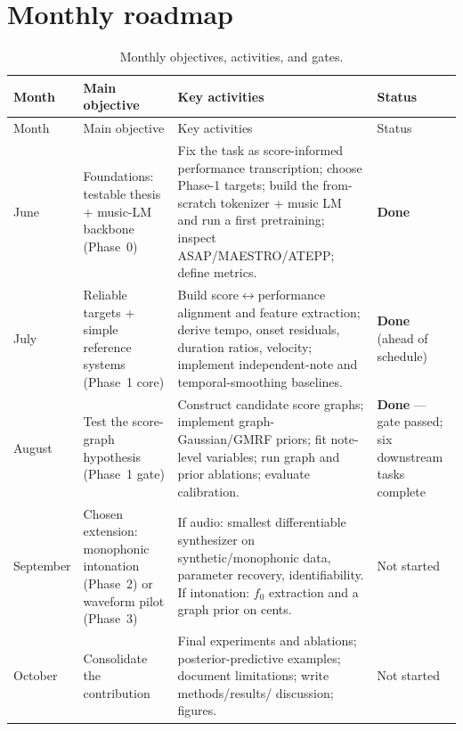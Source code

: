 \documentclass[11pt,a4paper]{report}
\begin{document}
\section{Monthly roadmap}
\begin{longtable}{@{}p{1.3cm}p{3.5cm}p{4.6cm}p{3.4cm}@{}}
\caption{Monthly objectives, activities, and gates.}\label{tab:monthly}\\
\toprule
Month & Main objective & Key activities & Status \\
\midrule
\endfirsthead
\toprule
Month & Main objective & Key activities & Status \\
\midrule
\endhead
\bottomrule
\endfoot
June & Foundations: testable thesis + music-LM backbone (Phase~0) &
Fix the task as score-informed performance transcription; choose Phase-1 targets;
build the from-scratch tokenizer + music LM and run a first pretraining; inspect
ASAP/MAESTRO/ATEPP; define metrics. & \textbf{Done} \\
July & Reliable targets + simple reference systems (Phase~1 core) &
Build score$\leftrightarrow$performance alignment and feature extraction; derive
tempo, onset residuals, duration ratios, velocity; implement independent-note and
temporal-smoothing baselines. & \textbf{Done} (ahead of schedule) \\
August & Test the score-graph hypothesis (Phase~1 gate) &
Construct candidate score graphs; implement graph-Gaussian/GMRF priors; fit
note-level variables; run graph and prior ablations; evaluate calibration. &
\textbf{Done} --- gate passed; six downstream tasks complete \\
September & Chosen extension: monophonic intonation (Phase~2) or waveform pilot
(Phase~3) & If audio: smallest differentiable synthesizer on synthetic/monophonic
data, parameter recovery, identifiability. If intonation: $f_0$ extraction and a
graph prior on cents. & Not started \\
October & Consolidate the contribution & Final experiments and ablations;
posterior-predictive examples; document limitations; write methods/results/
discussion; figures. & Not started \\
\end{longtable}
\end{document}
